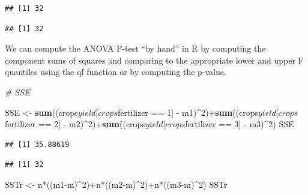\documentclass[]{book}
\newenvironment{Shaded}{\begin{snugshade}}{\end{snugshade}}
\newcommand{\KeywordTok}[1]{\textcolor[rgb]{0.13,0.29,0.53}{\textbf{{#1}}}}
\newcommand{\DecValTok}[1]{\textcolor[rgb]{0.00,0.00,0.81}{{#1}}}
\newcommand{\StringTok}[1]{\textcolor[rgb]{0.31,0.60,0.02}{{#1}}}
\newcommand{\CommentTok}[1]{\textcolor[rgb]{0.56,0.35,0.01}{\textit{{#1}}}}
\newcommand{\NormalTok}[1]{{#1}}
\begin{document}
\begin{verbatim}
## [1] 32
\end{verbatim}

\begin{Shaded}
\end{Shaded}

\begin{verbatim}
## [1] 32
\end{verbatim}

We can compute the ANOVA F-test ``by hand'' in R by computing the
component sums of squares and comparing to the appropriate lower and
upper F quantiles using the qf function or by computing the p-value.

\begin{Shaded}
\begin{Highlighting}[]
\CommentTok{# SSE}

\NormalTok{SSE <-}\StringTok{ }\KeywordTok{sum}\NormalTok{((crops$yield[crops$fertilizer ==}\StringTok{ }\DecValTok{1}\NormalTok{] -}\StringTok{ }\NormalTok{m1)^}\DecValTok{2}\NormalTok{)+}\KeywordTok{sum}\NormalTok{((crops$yield[crops$fertilizer ==}\StringTok{ }\DecValTok{2}\NormalTok{] -}\StringTok{ }\NormalTok{m2)^}\DecValTok{2}\NormalTok{)+}\KeywordTok{sum}\NormalTok{((crops$yield[crops$fertilizer ==}\StringTok{ }\DecValTok{3}\NormalTok{] -}\StringTok{ }\NormalTok{m3)^}\DecValTok{2}\NormalTok{)}
\NormalTok{SSE}
\end{Highlighting}
\end{Shaded}

\begin{verbatim}
## [1] 35.88619
\end{verbatim}

\begin{Shaded}
\end{Shaded}

\begin{verbatim}
## [1] 32
\end{verbatim}

\begin{Shaded}
\begin{Highlighting}[]
\NormalTok{SSTr <-}\StringTok{ }\NormalTok{n*((m1-m)^}\DecValTok{2}\NormalTok{)+n*((m2-m)^}\DecValTok{2}\NormalTok{)+n*((m3-m)^}\DecValTok{2}\NormalTok{)}
\NormalTok{SSTr}
\end{Highlighting}
\end{Shaded}
\end{document}

